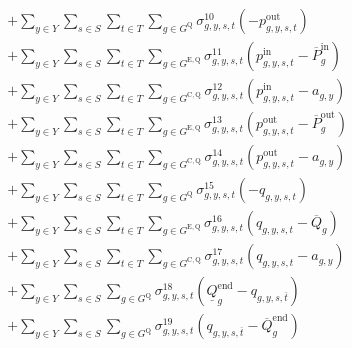 \documentclass{article}
\newcommand{\sStorage}{G^{\mathrm{Q}}}
\newcommand{\sStorageExisting}{G^{\mathrm{E,Q}}}
\newcommand{\sStorageCandidate}{G^{\mathrm{C,Q}}}
\newcommand{\sYears}{Y}
\newcommand{\sScenarios}{S}
\newcommand{\sIntervals}{T}
\newcommand{\iGenerator}{g}
\newcommand{\iYear}{y}
\newcommand{\iScenario}{s}
\newcommand{\iInterval}{t}
\newcommand{\iIntervalTerminal}{\overline{\iInterval}}
\newcommand{\cPowerChargingMax}[1][\iGenerator]{\overline{P}^{\mathrm{in}}_{#1}}
\newcommand{\cPowerDischargingMax}[1][\iGenerator]{\overline{P}^{\mathrm{out}}_{#1}}
\newcommand{\cStorageUnitEnergyMax}[1][\iGenerator]{\overline{Q}_{#1}}
\newcommand{\cStorageUnitEnergyIntervalEndMax}[1][\iGenerator]{\overline{Q}^{\mathrm{end}}_{#1}}
\newcommand{\cStorageUnitEnergyIntervalEndMin}[1][\iGenerator]{\underline{Q}^{\mathrm{end}}_{#1}}
\newcommand{\vPowerIn}[1][\iGenerator,\iYear,\iScenario,\iInterval]{p^{\mathrm{in}}_{#1}}
\newcommand{\vPowerOut}[1][\iGenerator,\iYear,\iScenario,\iInterval]{p^{\mathrm{out}}_{#1}}
\newcommand{\vStorageUnitEnergy}[1][\iGenerator,\iYear,\iScenario,\iInterval]{q_{#1}}
\newcommand{\vInstalledCapacityTotal}[1][\iGenerator,\iYear]{a_{#1}}
\newcommand{\dNonNegativeDischarging}[1][\iGenerator,\iYear,\iScenario,\iInterval]{\sigma_{#1}^{10}}
\newcommand{\dMaxChargingRateExisting}[1][\iGenerator,\iYear,\iScenario,\iInterval]{\sigma_{#1}^{11}}
\newcommand{\dMaxChargingRateCandidate}[1][\iGenerator,\iYear,\iScenario,\iInterval]{\sigma_{#1}^{12}}
\newcommand{\dMaxDischargingRateExisting}[1][\iGenerator,\iYear,\iScenario,\iInterval]{\sigma_{#1}^{13}}
\newcommand{\dMaxDischargingRateCandidate}[1][\iGenerator,\iYear,\iScenario,\iInterval]{\sigma_{#1}^{14}}
\newcommand{\dNonNegativeStorageEnergy}[1][\iGenerator,\iYear,\iScenario,\iInterval]{\sigma_{#1}^{15}}
\newcommand{\dMaxStorageEnergyExisting}[1][\iGenerator,\iYear,\iScenario,\iInterval]{\sigma_{#1}^{16}}
\newcommand{\dMaxStorageEnergyCandidate}[1][\iGenerator,\iYear,\iScenario,\iInterval]{\sigma_{#1}^{17}}
\newcommand{\dMinStorageEnergyIntervalEnd}[1][\iGenerator,\iYear,\iScenario,\iInterval]{\sigma_{#1}^{18}}
\newcommand{\dMaxStorageEnergyIntervalEnd}[1][\iGenerator,\iYear,\iScenario,\iInterval]{\sigma_{#1}^{19}}
\begin{document}
\begin{align}
		& + \sum\limits_{\iYear \in \sYears}\sum\limits_{\iScenario \in \sScenarios}\sum\limits_{\iInterval \in \sIntervals} \sum\limits_{\iGenerator \in \sStorage} \dNonNegativeDischarging \left(-\vPowerOut\right)\\
		& + \sum\limits_{\iYear \in \sYears}\sum\limits_{\iScenario \in \sScenarios}\sum\limits_{\iInterval \in \sIntervals} \sum\limits_{\iGenerator \in \sStorageExisting} \dMaxChargingRateExisting \left(\vPowerIn - \cPowerChargingMax\right)\\
		& + \sum\limits_{\iYear \in \sYears}\sum\limits_{\iScenario \in \sScenarios}\sum\limits_{\iInterval \in \sIntervals} \sum\limits_{\iGenerator \in \sStorageCandidate} \dMaxChargingRateCandidate \left(\vPowerIn - \vInstalledCapacityTotal\right)\\
		& + \sum\limits_{\iYear \in \sYears}\sum\limits_{\iScenario \in \sScenarios}\sum\limits_{\iInterval \in \sIntervals} \sum\limits_{\iGenerator \in \sStorageExisting} \dMaxDischargingRateExisting \left(\vPowerOut - \cPowerDischargingMax\right)\\
		& + \sum\limits_{\iYear \in \sYears}\sum\limits_{\iScenario \in \sScenarios}\sum\limits_{\iInterval \in \sIntervals} \sum\limits_{\iGenerator \in \sStorageCandidate} \dMaxDischargingRateCandidate \left(\vPowerOut - \vInstalledCapacityTotal\right)\\
		& + \sum\limits_{\iYear \in \sYears}\sum\limits_{\iScenario \in \sScenarios}\sum\limits_{\iInterval \in \sIntervals} \sum\limits_{\iGenerator \in \sStorage} \dNonNegativeStorageEnergy \left(- \vStorageUnitEnergy\right)\\
		& + \sum\limits_{\iYear \in \sYears}\sum\limits_{\iScenario \in \sScenarios}\sum\limits_{\iInterval \in \sIntervals} \sum\limits_{\iGenerator \in \sStorageExisting} \dMaxStorageEnergyExisting \left(\vStorageUnitEnergy - \cStorageUnitEnergyMax\right)\\
		& + \sum\limits_{\iYear \in \sYears}\sum\limits_{\iScenario \in \sScenarios}\sum\limits_{\iInterval \in \sIntervals} \sum\limits_{\iGenerator \in \sStorageCandidate} \dMaxStorageEnergyCandidate \left(\vStorageUnitEnergy - \vInstalledCapacityTotal\right)\\
		& + \sum\limits_{\iYear \in \sYears}\sum\limits_{\iScenario \in \sScenarios} \sum\limits_{\iGenerator \in \sStorage} \dMinStorageEnergyIntervalEnd \left(\cStorageUnitEnergyIntervalEndMin - \vStorageUnitEnergy[\iGenerator,\iYear,\iScenario,\iIntervalTerminal]\right)\\
		& + \sum\limits_{\iYear \in \sYears}\sum\limits_{\iScenario \in \sScenarios} \sum\limits_{\iGenerator \in \sStorage} \dMaxStorageEnergyIntervalEnd \left(\vStorageUnitEnergy[\iGenerator,\iYear,\iScenario,\iIntervalTerminal] - \cStorageUnitEnergyIntervalEndMax\right)\\

\end{align}
\end{document}
